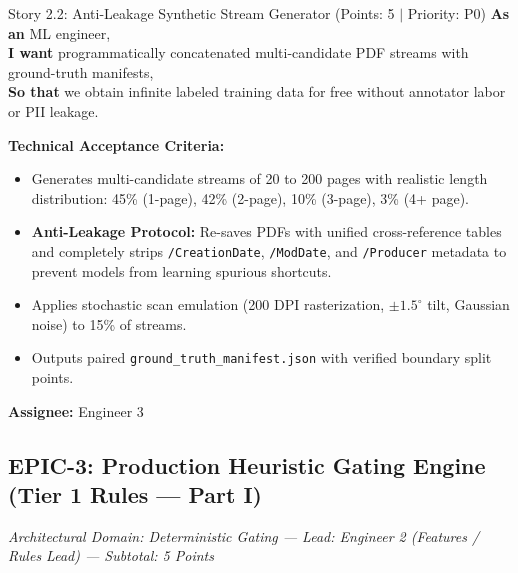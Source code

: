 \documentclass[11pt,a4paper]{article}
\begin{document}
\begin{storybox}{Story 2.2: Anti-Leakage Synthetic Stream Generator (Points: 5 $|$ Priority: P0)}
\textbf{As an} ML engineer, \\
\textbf{I want} programmatically concatenated multi-candidate PDF streams with ground-truth manifests, \\
\textbf{So that} we obtain infinite labeled training data for free without annotator labor or PII leakage.

\vspace{0.3em}
\textbf{Technical Acceptance Criteria:}
\begin{itemize}[leftmargin=1.2em, itemsep=1pt]
    \item Generates multi-candidate streams of 20 to 200 pages with realistic length distribution: 45\% (1-page), 42\% (2-page), 10\% (3-page), 3\% (4+ page).
    \item \textbf{Anti-Leakage Protocol:} Re-saves PDFs with unified cross-reference tables and completely strips \texttt{/CreationDate}, \texttt{/ModDate}, and \texttt{/Producer} metadata to prevent models from learning spurious shortcuts.
    \item Applies stochastic scan emulation (200 DPI rasterization, $\pm 1.5^\circ$ tilt, Gaussian noise) to 15\% of streams.
    \item Outputs paired \texttt{ground\_truth\_manifest.json} with verified boundary split points.
\end{itemize}
\textbf{Assignee:} Engineer 3
\end{storybox}

\clearpage

\subsection{EPIC-3: Production Heuristic Gating Engine (Tier 1 Rules --- Part I)}
\textit{Architectural Domain: Deterministic Gating --- Lead: Engineer 2 (Features / Rules Lead) --- Subtotal: 5 Points}

\vspace{0.5em}
\end{document}
